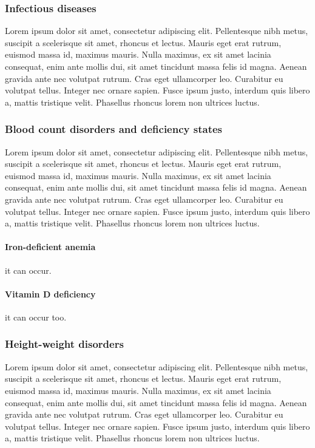 \subsubsection{Infectious diseases}\label{sub:infectiousdiseases}
Lorem ipsum dolor sit amet, consectetur adipiscing elit. Pellentesque nibh metus, suscipit a scelerisque sit amet, rhoncus et lectus. Mauris eget erat rutrum, euismod massa id, maximus mauris. Nulla maximus, ex sit amet lacinia consequat, enim ante mollis dui, sit amet tincidunt massa felis id magna. Aenean gravida ante nec volutpat rutrum. Cras eget ullamcorper leo. Curabitur eu volutpat tellus. Integer nec ornare sapien. Fusce ipsum justo, interdum quis libero a, mattis tristique velit. Phasellus rhoncus lorem non ultrices luctus.

\subsubsection{Blood count disorders and deficiency states}\label{sub:bloodcountdisorders}
Lorem ipsum dolor sit amet, consectetur adipiscing elit. Pellentesque nibh metus, suscipit a scelerisque sit amet, rhoncus et lectus. Mauris eget erat rutrum, euismod massa id, maximus mauris. Nulla maximus, ex sit amet lacinia consequat, enim ante mollis dui, sit amet tincidunt massa felis id magna. Aenean gravida ante nec volutpat rutrum. Cras eget ullamcorper leo. Curabitur eu volutpat tellus. Integer nec ornare sapien. Fusce ipsum justo, interdum quis libero a, mattis tristique velit. Phasellus rhoncus lorem non ultrices luctus.


\paragraph{Iron-deficient anemia}\label{par:iron-deficiency} it can occur.

\paragraph{Vitamin D deficiency}\label{par:vitaminddeficiency} it can occur too.

\subsubsection{Height-weight disorders}\label{sub:heightweightdisorders}
Lorem ipsum dolor sit amet, consectetur adipiscing elit. Pellentesque nibh metus, suscipit a scelerisque sit amet, rhoncus et lectus. Mauris eget erat rutrum, euismod massa id, maximus mauris. Nulla maximus, ex sit amet lacinia consequat, enim ante mollis dui, sit amet tincidunt massa felis id magna. Aenean gravida ante nec volutpat rutrum. Cras eget ullamcorper leo. Curabitur eu volutpat tellus. Integer nec ornare sapien. Fusce ipsum justo, interdum quis libero a, mattis tristique velit. Phasellus rhoncus lorem non ultrices luctus.

